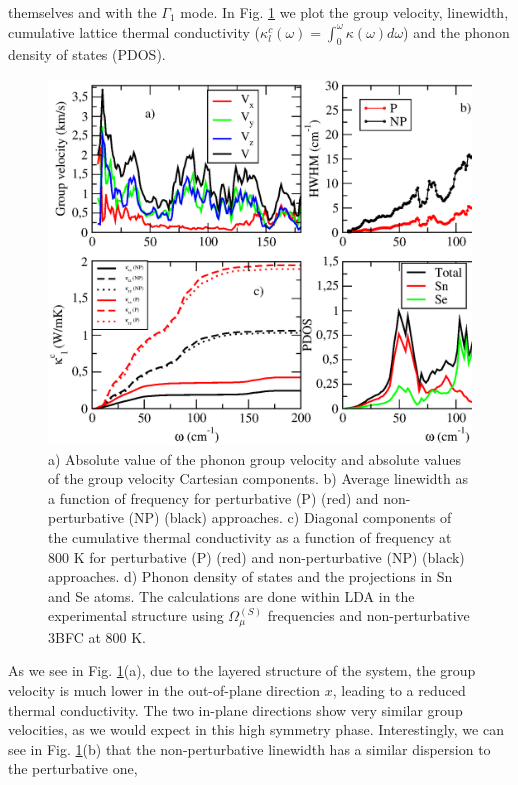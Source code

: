 themselves and with the $\Gamma_1$ mode. In Fig. \ref{thermal-analysis} we plot the group velocity, linewidth, cumulative lattice thermal conductivity
($\kappa_{l}^{c}(\omega)=\int_{0}^{\omega}\kappa(\omega)d\omega$) and the phonon density of states (PDOS).
\begin{figure}[th]
\includegraphics[width=\linewidth]{Figures/thermal_analysis.eps}
\caption[Thermal propertie of $Cmcm$ SnSe.]{a) Absolute value of the phonon group velocity and absolute values of the group velocity Cartesian
components. b) Average linewidth as a function of frequency for perturbative (P) (red) and non-perturbative (NP)
(black) approaches. c) Diagonal components of the cumulative thermal conductivity as a function of frequency at $800$
K for perturbative (P) (red) and non-perturbative (NP) (black) approaches. d) Phonon density of states and the
projections in Sn and Se atoms. The calculations are done within LDA in the experimental structure using
$\Omega^{(S)}_{\mu}$ frequencies and non-perturbative 3BFC at $800$ K.}
\label{thermal-analysis}
\end{figure}
As we see in Fig. \ref{thermal-analysis}(a), due to the layered structure of the system, the group velocity is much
lower in the out-of-plane direction $x$, leading to a reduced thermal conductivity. The two in-plane directions show
very similar group velocities, as we would expect in this high symmetry phase. Interestingly, we can see in
Fig. \ref{thermal-analysis}(b) that the non-perturbative linewidth has a similar dispersion to the perturbative one,
